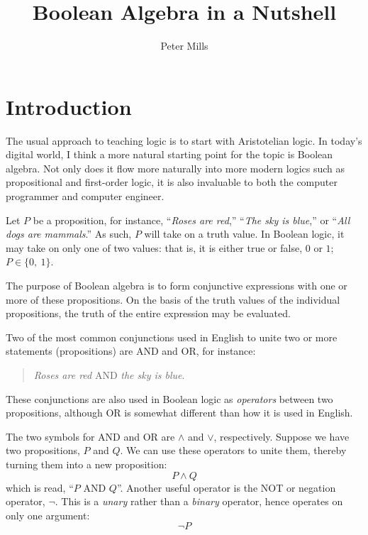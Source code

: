 \documentclass{article}
\begin{document}
\title{Boolean Algebra in a Nutshell}

\author{Peter Mills}

\maketitle

\section{Introduction}

The usual approach to teaching logic is to start with Aristotelian logic.
In today's digital world, I think a more natural starting point for the
topic is Boolean algebra.
Not only does it flow more naturally into more modern logics such as propositional
and first-order logic, it is also invaluable to both the computer programmer
and computer engineer.

Let $P$ be a proposition, for instance, ``{\it Roses are red},''
``{\it The sky is blue},'' or ``{\it All dogs are mammals}.''
As such, $P$ will take on a truth value.
In Boolean logic, it may take on only one of two values: 
that is, it is either true or false, $0$ or $1$; $P \in \lbrace 0, ~ 1 \rbrace$.

The purpose of Boolean algebra is to form conjunctive expressions with one or
more of these propositions.
On the basis of the truth values of the individual propositions, the truth
of the entire expression may be evaluated.

Two of the most common conjunctions used in English to unite two or more
statements (propositions) are AND and OR, for instance:
\begin{quote}
	{\it Roses are red} AND {\it the sky is blue}.
\end{quote}
These conjunctions are also used in Boolean logic as {\it operators} between
two propositions,
although OR is somewhat different than how it is used in English.

The two symbols for AND and OR are $\land$ and $\lor$, respectively.
Suppose we have two propositions, $P$ and $Q$.
We can use these operators to unite them, thereby turning them into a new
proposition:
\begin{equation}
	P \land Q
\end{equation}
which is read, ``$P$ AND $Q$''.
Another useful operator is the NOT or negation operator, $\lnot$.
This is a {\it unary} rather than a {\it binary} operator, hence operates on
only one argument:
\begin{equation}
	\lnot P
\end{equation}
\end{document}
